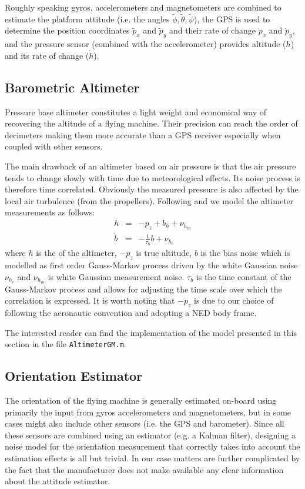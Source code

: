 \documentclass[a4paper,11pt]{report}
\begin{document}
Roughly speaking gyros, accelerometers and magnetometers are combined to estimate the platform attitude (i.e. the angles $\tilde{\phi},\tilde{\theta},\tilde{\psi}$), the GPS is used to determine the position coordinates $\tilde{p}_x$ and $\tilde{p}_y$ and their rate of change $\dot{p}_x$ and $\dot{p}_y$, and the pressure sensor (combined with the accelerometer) provides altitude ($h$) 
and its rate of change ($\dot{h}$).


\subsection{Barometric Altimeter}

Pressure base altimeter constitutes a light weight and economical way of recovering the altitude of a flying machine. Their precision can reach the order of decimeters making them more accurate than a GPS receiver especially when coupled with other sensors. 

The main drawback of an altimeter based on air pressure is that the air pressure tends to change slowly with time due to meteorological effects.  Its noise process is therefore time correlated. Obviously the measured pressure is also affected by the local air turbulence (from the propellers).
Following \cite{stanley1991akalman} and \cite{seo2004position} we model the altimeter measurements as follows:
\begin{eqnarray}
      h&=&-p_z+b_h+\nu_{h_m}  \\
       \dot{b}&=&-\frac{1}{\tau_b}b+\nu_{h_c}
\end{eqnarray}
where $h$ is the of the altimeter, $-p_z$ is true altitude, $b$ is the bias noise which is modelled as first order Gauss-Markov process driven by the white Gaussian noise $\nu_{h_c}$ and $\nu_{h_m}$ is white Gaussian measurement noise. $\tau_b$ is the time constant of the Gauss-Markov process and allows for adjusting the time scale over which the correlation is expressed.
It is worth noting that $-p_z$ is due to our choice of following the aeronautic convention and adopting a NED body frame.

The interested reader can find the implementation of the model presented in this section in the file \texttt{AltimeterGM.m}.  


\subsection{Orientation Estimator}

The orientation of the flying machine is generally estimated on-board using primarily the input from gyros accelerometers and magnetometers, but in some cases might also include  other sensors (i.e. the GPS and barometer). Since all these sensors are combined using an estimator (e.g. a Kalman filter), designing a noise model for the orientation measurement that correctly takes into account the estimation effects is all but trivial. In our case matters are further complicated by the fact that the manufacturer does not make available any clear information about the attitude estimator.
 
\end{document}
